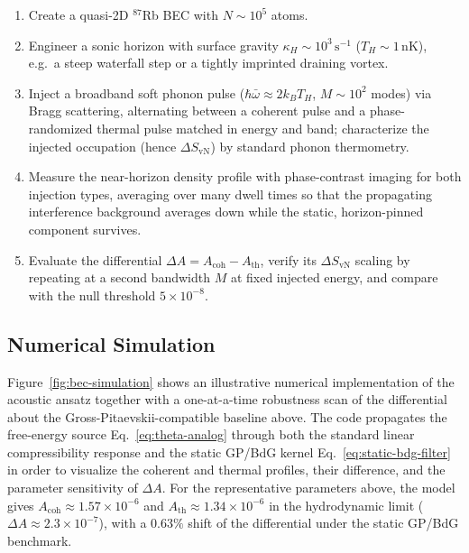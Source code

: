 \documentclass[aps,prd,twocolumn,superscriptaddress,nofootinbib,floatfix]{revtex4-2}
\begin{document}
\begin{enumerate}
    \item Create a quasi-2D $^{87}$Rb BEC with $N \sim 10^5$ atoms.
    \item Engineer a sonic horizon with surface gravity $\kappa_H \sim 10^3\,\mathrm{s^{-1}}$ ($T_H \sim 1\,\mathrm{nK}$), e.g.\ a steep waterfall step or a tightly imprinted draining vortex.
    \item Inject a broadband soft phonon pulse ($\hbar\bar{\omega} \approx 2 k_B T_H$, $M \sim 10^2$ modes) via Bragg scattering, alternating between a coherent pulse and a phase-randomized thermal pulse matched in energy and band; characterize the injected occupation (hence $\Delta S_{\mathrm{vN}}$) by standard phonon thermometry.
    \item Measure the near-horizon density profile with phase-contrast imaging for both injection types, averaging over many dwell times so that the propagating interference background averages down while the static, horizon-pinned component survives.
    \item Evaluate the differential $\Delta A = A_{\mathrm{coh}} - A_{\mathrm{th}}$, verify its $\Delta S_{\mathrm{vN}}$ scaling by repeating at a second bandwidth $M$ at fixed injected energy, and compare with the null threshold $5\times10^{-8}$.
\end{enumerate}

\subsection{Numerical Simulation}

Figure~\ref{fig:bec-simulation} shows an illustrative numerical implementation of the acoustic ansatz together with a one-at-a-time robustness scan of the differential about the Gross-Pitaevskii-compatible baseline above. The code propagates the free-energy source Eq.~\eqref{eq:theta-analog} through both the standard linear compressibility response and the static GP/BdG kernel Eq.~\eqref{eq:static-bdg-filter} in order to visualize the coherent and thermal profiles, their difference, and the parameter sensitivity of $\Delta A$. For the representative parameters above, the model gives $A_{\mathrm{coh}} \approx 1.57 \times 10^{-6}$ and $A_{\mathrm{th}} \approx 1.34 \times 10^{-6}$ in the hydrodynamic limit ($\Delta A \approx 2.3\times10^{-7}$), with a $0.63\%$ shift of the differential under the static GP/BdG benchmark.
\end{document}

